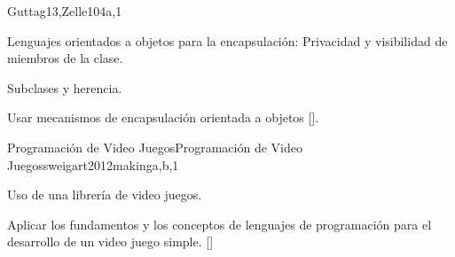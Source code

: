 \begin{syllabus}
\begin{unit}{\PLObjectOrientedProgramming}{}{Guttag13,Zelle10}{4}{a,1}
    \begin{topics}
        \item Lenguajes orientados a objetos para la encapsulación: Privacidad y visibilidad de miembros de la clase.
        \item \PLObjectOrientedProgrammingTopicDefinition
        \item Subclases y herencia.
        \item \PLObjectOrientedProgrammingTopicDynamic
    \end{topics}

    \begin{learningoutcomes}
        \item \PLObjectOrientedProgrammingLODesignAndClass [\Usage] 
        \item \PLObjectOrientedProgrammingLOUseSubclassing [\Familiarity] 
        \item \PLObjectOrientedProgrammingLOCompareAndThe [\Familiarity]
        \item \PLObjectOrientedProgrammingLOExplainTheObject [\Familiarity] 
        \item Usar mecanismos de encapsulación orientada a objetos [\Familiarity].   
     \end{learningoutcomes}
\end{unit}

\begin{unit}{Programación de Video Juegos}{Programación de Video Juegos}{sweigart2012making}{}{a,b,1}
    \begin{topics}
        \item Uso de una librería de video juegos.
    \end{topics}
    \begin{learningoutcomes}    
        \item Aplicar los fundamentos y los conceptos de lenguajes de programación para el desarrollo de un video juego simple.  [\Usage] 
    \end{learningoutcomes}
\end{unit}

\begin{coursebibliography}
\end{coursebibliography}

\end{syllabus}
